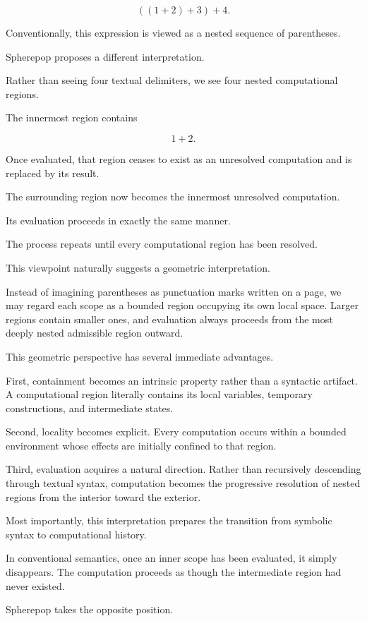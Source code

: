 \documentclass[12pt,oneside]{article}
\theoremstyle{definition}
\theoremstyle{remark}
\begin{document}
\[
((1+2)+3)+4.
\]

Conventionally, this expression is viewed as a nested sequence of parentheses.

Spherepop proposes a different interpretation.

Rather than seeing four textual delimiters, we see four nested computational
regions.

The innermost region contains

\[
1+2.
\]

Once evaluated, that region ceases to exist as an unresolved computation and
is replaced by its result.

The surrounding region now becomes the innermost unresolved computation.

Its evaluation proceeds in exactly the same manner.

The process repeats until every computational region has been resolved.

This viewpoint naturally suggests a geometric interpretation.

Instead of imagining parentheses as punctuation marks written on a page, we
may regard each scope as a bounded region occupying its own local space.
Larger regions contain smaller ones, and evaluation always proceeds from the
most deeply nested admissible region outward.

This geometric perspective has several immediate advantages.

First, containment becomes an intrinsic property rather than a syntactic
artifact. A computational region literally contains its local variables,
temporary constructions, and intermediate states.

Second, locality becomes explicit. Every computation occurs within a bounded
environment whose effects are initially confined to that region.

Third, evaluation acquires a natural direction. Rather than recursively
descending through textual syntax, computation becomes the progressive
resolution of nested regions from the interior toward the exterior.

Most importantly, this interpretation prepares the transition from symbolic
syntax to computational history.

In conventional semantics, once an inner scope has been evaluated, it simply
disappears. The computation proceeds as though the intermediate region had
never existed.

Spherepop takes the opposite position.
\end{document}
